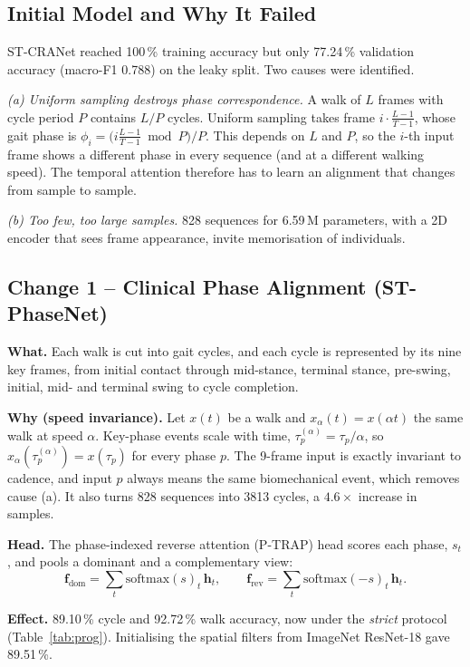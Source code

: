 \documentclass[conference]{IEEEtran}
\begin{document}
\subsection{Initial Model and Why It Failed}
ST-CRANet reached 100\,\% training accuracy but only 77.24\,\% validation
accuracy (macro-F1 0.788) on the leaky split. Two causes were identified.

\emph{(a) Uniform sampling destroys phase correspondence.} A walk of $L$ frames
with cycle period $P$ contains $L/P$ cycles. Uniform sampling takes frame
$i\cdot\frac{L-1}{T-1}$, whose gait phase is
$\phi_i=\big(i\frac{L-1}{T-1}\bmod P\big)/P$. This depends on $L$ and $P$, so
the $i$-th input frame shows a different phase in every sequence (and at a
different walking speed). The temporal attention therefore has to learn an
alignment that changes from sample to sample.

\emph{(b) Too few, too large samples.} 828 sequences for 6.59\,M parameters,
with a 2D encoder that sees frame appearance, invite memorisation of individuals.

\subsection{Change 1 -- Clinical Phase Alignment (ST-PhaseNet)}
\textbf{What.} Each walk is cut into gait cycles, and each cycle is represented
by its nine key frames, from initial contact through mid-stance, terminal
stance, pre-swing, initial, mid- and terminal swing to cycle completion.

\textbf{Why (speed invariance).} Let $x(t)$ be a walk and $x_\alpha(t)=x(\alpha
t)$ the same walk at speed $\alpha$. Key-phase events scale with time,
$\tau^{(\alpha)}_p=\tau_p/\alpha$, so $x_\alpha(\tau^{(\alpha)}_p)=x(\tau_p)$
for every phase $p$. The 9-frame input is exactly invariant to cadence, and
input $p$ always means the same biomechanical event, which removes cause (a). It
also turns 828 sequences into 3813 cycles, a $4.6\times$ increase in samples.

\textbf{Head.} The phase-indexed reverse attention (P-TRAP) head scores each
phase, $s_t$, and pools a dominant and a complementary view:
\begin{equation}
\mathbf{f}_{\text{dom}}=\sum_t \mathrm{softmax}(s)_t\,\mathbf{h}_t,\qquad
\mathbf{f}_{\text{rev}}=\sum_t \mathrm{softmax}(-s)_t\,\mathbf{h}_t .
\end{equation}

\textbf{Effect.} 89.10\,\% cycle and 92.72\,\% walk accuracy, now under the
\emph{strict} protocol (Table~\ref{tab:prog}). Initialising the spatial filters
from ImageNet ResNet-18 gave 89.51\,\%.
\end{document}
